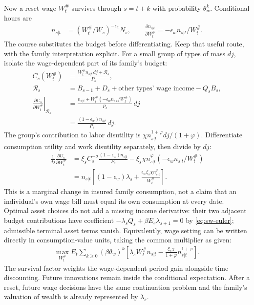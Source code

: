 Now a reset wage $W_t^{\#}$ survives through $s=t+k$ with probability
$\theta_w^k$. Conditional hours are
\begin{align}
 n_{s|t}&=(W_t^{\#}/W_s)^{-\epsilon_w}N_s,\qquad
 \frac{\partial n_{s|t}}{\partial W_t^{\#}}
                  =-\epsilon_wn_{s|t}/W_t^{\#}.
\end{align}
The course substitutes the budget before differentiating. Keep that useful
route, with the family interpretation explicit. For a small group of types
of mass $dj$, isolate the wage-dependent part of its family's budget:
\begin{align}
 C_s(W_t^{\#})
 &=\frac{W_t^{\#}n_{s|t}\,dj+\mathcal R_s}{P_s},\\
 \mathcal R_s&=B_{s-1}+D_s+\text{other types' wage income}-Q_sB_s,\\
 \left.\frac{\partial C_s}{\partial W_t^{\#}}\right|_{\mathcal R_s}
 &=\frac{n_{s|t}+W_t^{\#}(-\epsilon_wn_{s|t}/W_t^{\#})}{P_s}\,dj\\
 &=\frac{(1-\epsilon_w)n_{s|t}}{P_s}\,dj.
\end{align}
The group's contribution to labor disutility is
$\chi n_{s|t}^{1+\varphi}dj/(1+\varphi)$. Differentiate consumption utility
and work disutility separately, then divide by $dj$:
\begin{align}
 \frac1{dj}\frac{\partial U_s}{\partial W_t^{\#}}
 &=\xi_s C_s^{-\sigma}\frac{(1-\epsilon_w)n_{s|t}}{P_s}
       -\xi_s\chi n_{s|t}^\varphi(-\epsilon_wn_{s|t}/W_t^{\#})\\
 &=n_{s|t}\left[(1-\epsilon_w)\lambda_s
           +\frac{\epsilon_w\xi_s\chi n_{s|t}^{\varphi}}{W_t^{\#}}\right].
\end{align}
This is a marginal change in insured family consumption, not a claim that
an individual's own wage bill must equal its own consumption at every date.
Optimal asset choices do not add a missing income derivative: their two
adjacent budget contributions have coefficient
$-\lambda_sQ_s+\beta E_s\lambda_{s+1}=0$ by \eqref{eq:sw-euler}; admissible
terminal asset terms vanish. Equivalently, wage setting can be written directly
in consumption-value units, taking the common multiplier as given:
\begin{align}
 \max_{W_t^{\#}}E_t\sum_{k\geq0}(\beta\theta_w)^k
 \left[\lambda_sW_t^{\#}n_{s|t}
                   -\frac{\xi_s\chi}{1+\varphi}n_{s|t}^{1+\varphi}\right].
 \label{eq:sw-wage-objective}
\end{align}
The survival factor weights the wage-dependent period gain alongside time discounting.
Future innovations remain inside the conditional expectation. After a reset,
future wage decisions have the same continuation problem and the family's
valuation of wealth is already represented by $\lambda_s$.

